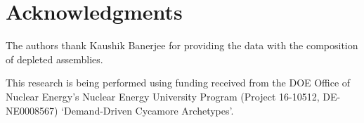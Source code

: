 \section{Acknowledgments}
The authors thank Kaushik Banerjee for providing the data with the
composition of depleted assemblies.

This research is being performed using funding received from the DOE Office of Nuclear Energy's
Nuclear Energy University Program (Project 16-10512, DE-NE0008567) `Demand-Driven Cycamore Archetypes'.